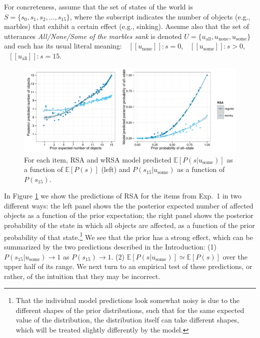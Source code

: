 \documentclass[10pt,letterpaper]{article}
\newcommand{\red}[1]{\textcolor{Red}{#1}}
\newcommand{\denote}[1]{\mbox{ $[\![ #1 ]\!]$}}
\begin{document}
For concreteness, assume that the set of states of the world is $S = \{s_0, s_1, s_2, \dots, s_{15}\}$, where the subscript indicates the number of objects (e.g., marbles) that exhibit a certain effect (e.g., sinking). 
Assume also that the set of utterances \emph{All/None/Some of the marbles sank} is denoted $U = \{u_{\textrm{all}}, u_{\textrm{none}}, u_{\textrm{some}}\}$ and each has its usual literal meaning: 
$\denote{u_{\textrm{none}}}: s=0$,  
$\denote{u_{\textrm{some}}}: s>0$,
$\denote{u_{\textrm{all}}}: s=15$.

\begin{figure}
	\includegraphics[width=\textwidth]{pics/rsa-predictions}
	\caption{For each item, RSA and wRSA model predicted $\mathbb{E}[P(s|u_{\textrm{some}})]$ as a function of $\mathbb{E}[P(s)]$ (left) and $P(s_{15}|u_{\textrm{some}})$ as a function of $P(s_{15})$.}
	\label{fig:rrsaexppredictions}	
\end{figure}

In Figure \ref{fig:rrsaexppredictions} we show the predictions of RSA for the items from Exp.~1 in two different ways: the left panel shows the the posterior expected number of affected objects as a function of the prior expectation; the right panel shows the posterior probability of the state in which all objects are affected, as a function of the prior probability of that state.\footnote{That the individual model predictions look somewhat noisy is due to the different shapes of the prior distributions, such that for the same expected value of the distribution, the distribution itself can take different shapes, which will be treated slightly differently by the model.}   %
We see that the prior has a strong effect, which can be summarized by the two predictions described in the Introduction: 
(1) $P(s_{15}|u_{\textrm{some}}) \rightarrow 1$ as $P(s_{15})\rightarrow 1$. 
(2) $\mathbb{E}[P(s|u_{\textrm{some}})] \simeq \mathbb{E}[P(s)]$ over the upper half of its range. 
We next turn to an empirical test of these predictions, or rather, of the intuition that they may be incorrect.
\end{document}
